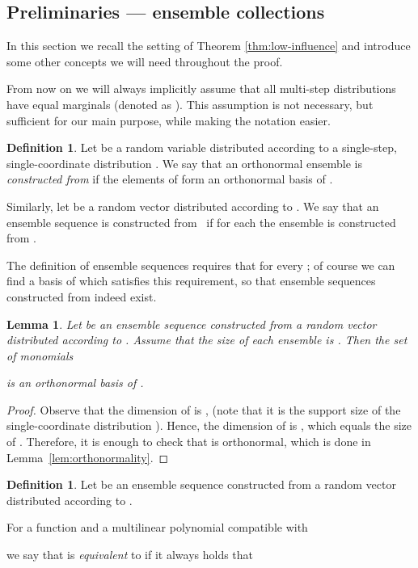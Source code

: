 \documentclass{daj}
\newcommand{\1}{\mathbbm{1}}
\theoremstyle{plain}
\newtheorem{lemma}[theorem]{Lemma}
\theoremstyle{definition}
\newtheorem{definition}[theorem]{Definition}
\begin{document}
\subsection{Preliminaries --- ensemble collections}
\label{sec:app-pre-2}

In this section we recall the setting of Theorem \ref{thm:low-influence}
and introduce some other concepts we will need throughout the proof.

From now on we will always implicitly assume that all multi-step distributions 
 have equal marginals (denoted as ). 
This assumption is not necessary, but sufficient for our main purpose,
while making the notation easier.

\begin{definition}
Let  be a random variable distributed according to a 
single-step, single-coordinate distribution .
We say that an orthonormal ensemble  is
\emph{constructed from } if the elements
of  form an orthonormal basis of .

Similarly, let  be a random vector distributed
according to .
We say that an ensemble sequence  is constructed 
from~ if for each  
the ensemble  is constructed from .
\end{definition}

The definition of ensemble sequences requires that  for every ; of course we can find a basis 
of  which satisfies this requirement, so that 
ensemble sequences constructed from  indeed exist.

\begin{lemma}
\label{lem:product-base}
Let  be an ensemble sequence constructed
from a random vector 
 distributed according to
.
Assume that the size of each ensemble  is .
Then the set of monomials

is an orthonormal basis of .
\end{lemma}

\begin{proof}
Observe that the dimension of  is , (note that
it is the support size of the single-coordinate distribution 
).
Hence, the dimension of  is ,
which equals the size of .
Therefore, it is enough to check that  is
orthonormal, which is done in Lemma~\ref{lem:orthonormality}. 
\end{proof}

\begin{definition}
Let  be an ensemble sequence constructed from a 
random vector  distributed according to 
.

For a function 
and a multilinear polynomial  compatible with

we say that 
is \emph{equivalent} to  if it always holds that

\end{definition}
\end{document}
